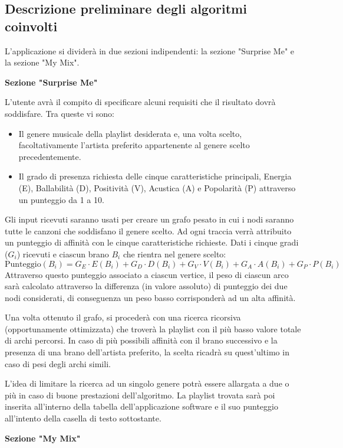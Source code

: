 \documentclass[12pt, a4paper]{article}
\begin{document}
\subsection{Descrizione preliminare degli algoritmi coinvolti}
L'applicazione si dividerà in due sezioni indipendenti: la sezione "Surprise Me" e la sezione "My Mix".

\textbf{Sezione "Surprise Me"}

L’utente avrà il compito di specificare alcuni requisiti che il risultato dovrà soddisfare. Tra queste vi sono:
\begin{itemize}
\item Il genere musicale della playlist desiderata e, una volta scelto, facoltativamente l’artista preferito appartenente al genere scelto precedentemente.
\item Il grado di presenza richiesta delle cinque caratteristiche principali, Energia (E), Ballabilità (D), Positività (V), Acustica (A) e Popolarità (P) attraverso un punteggio da 1 a 10.
\end{itemize}

Gli input ricevuti saranno usati per creare un grafo pesato in cui i nodi saranno tutte le canzoni che soddisfano il genere scelto.
Ad ogni traccia verrà attribuito un punteggio di affinità con le cinque caratteristiche richieste.
Dati i cinque gradi ($G_i$) ricevuti e ciascun brano $B_i$ che rientra nel genere scelto:
$$ \text{Punteggio}(B_i) = G_E \cdot E(B_i) + G_D \cdot D(B_i) + G_V \cdot V(B_i) + G_A \cdot A(B_i) + G_P \cdot P(B_i) $$
Attraverso questo punteggio associato a ciascun vertice, il peso di ciascun arco sarà calcolato attraverso la differenza (in valore assoluto) di punteggio dei due nodi considerati, di conseguenza un peso basso corrisponderà ad un alta affinità. \par
Una volta ottenuto il grafo, si procederà con una ricerca ricorsiva (opportunamente ottimizzata) che troverà la playlist con il più basso valore totale di archi percorsi. In caso di più possibili affinità con il brano successivo e la presenza di una brano dell’artista preferito, la scelta ricadrà su quest’ultimo in caso di pesi degli archi simili. \par
L’idea di limitare la ricerca ad un singolo genere potrà essere allargata a due o più in caso di buone prestazioni dell’algoritmo.
La playlist trovata sarà poi inserita all’interno della tabella dell’applicazione software e il suo punteggio all’intento della casella di testo sottostante.

\newpage
\textbf{Sezione "My Mix"}
\end{document}
